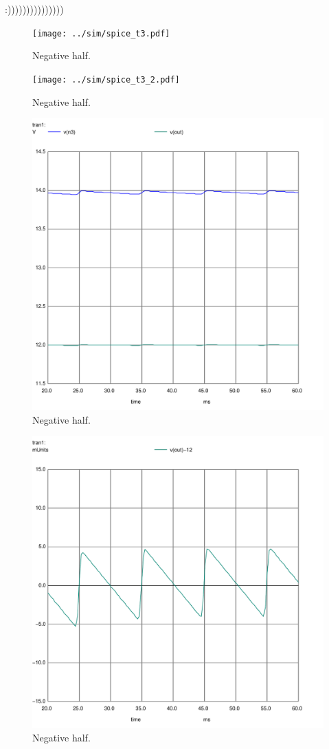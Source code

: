 :)))))))))))))))

\begin{figure}[h] \centering
  \texttt{[image: ../sim/spice\_t3.pdf]}
  \caption{Negative half.}
  \label{fig:11}
\end{figure}

\begin{figure}[h] \centering
  \texttt{[image: ../sim/spice\_t3\_2.pdf]}
  \caption{Negative half.}
  \label{fig:22}
\end{figure}

\begin{figure}[h] \centering
  \includegraphics[scale=0.42]{Spice_t3_Zoom.pdf}
  \caption{Negative half.}
  \label{fig:33}
\end{figure}

\begin{figure}[h] \centering
  \includegraphics[scale=0.42]{Spice_t3_2_Zoom.pdf}
  \caption{Negative half.}
  \label{fig:44}
\end{figure}